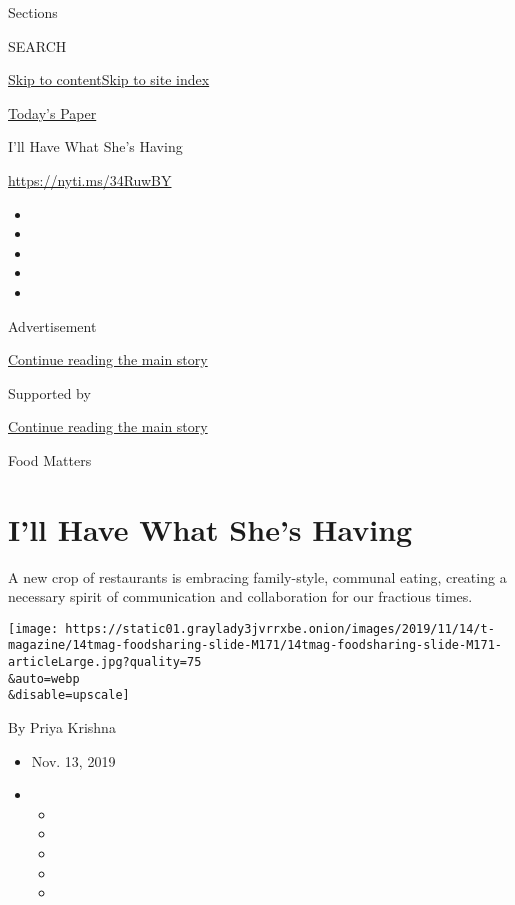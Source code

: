 Sections

SEARCH

\protect\hyperlink{site-content}{Skip to
content}\protect\hyperlink{site-index}{Skip to site index}

\href{https://myaccount.nytimes3xbfgragh.onion/auth/login?response_type=cookie\&client_id=vi}{}

\href{https://www.nytimes3xbfgragh.onion/section/todayspaper}{Today's
Paper}

I'll Have What She's Having

\url{https://nyti.ms/34RuwBY}

\begin{itemize}
\item
\item
\item
\item
\item
\end{itemize}

Advertisement

\protect\hyperlink{after-top}{Continue reading the main story}

Supported by

\protect\hyperlink{after-sponsor}{Continue reading the main story}

Food Matters

\hypertarget{ill-have-what-shes-having}{%
\section{I'll Have What She's Having}\label{ill-have-what-shes-having}}

A new crop of restaurants is embracing family-style, communal eating,
creating a necessary spirit of communication and collaboration for our
fractious times.

\texttt{[image: https://static01.graylady3jvrrxbe.onion/images/2019/11/14/t-magazine/14tmag-foodsharing-slide-M171/14tmag-foodsharing-slide-M171-articleLarge.jpg?quality=75\\\&auto=webp\\\&disable=upscale]}

By Priya Krishna

\begin{itemize}
\item
  Nov. 13, 2019
\item
  \begin{itemize}
  \item
  \item
  \item
  \item
  \item
  \end{itemize}
\end{itemize}

